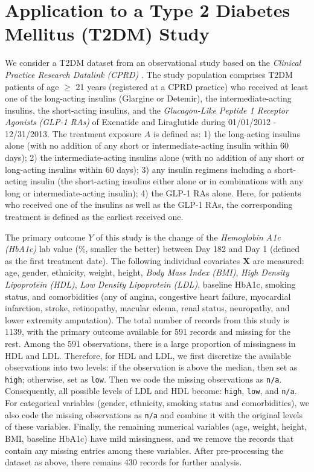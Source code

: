 \documentclass[11pt]{article}
\theoremstyle{definition}
\theoremstyle{remark}
\newcommand{\bX}{\bm{X}}
\begin{document}
\section{Application to a Type 2 Diabetes Mellitus (T2DM) Study}\label{sec:t2dm}

We consider a T2DM dataset from an observational study based on the \textit{Clinical Practice Research Datalink (CPRD)} \citep{herrett2015data,chen2018estimating}. The study population comprises T2DM patients of age $ \ge $ 21 years (registered 
at a CPRD practice) who received at least one of the long-acting insulins (Glargine or Detemir), the intermediate-acting insulins, the short-acting insulins, and the \textit{Glucagon-Like Peptide 1 Receptor Agonists (GLP-1 RAs)} of Exenatide and Liraglutide during 01/01/2012 - 12/31/2013. The treatment exposure $ A $ is defined as: 1) the long-acting insulins alone (with no addition of any short or intermediate-acting insulin within 60 days); 2) the intermediate-acting insulins alone (with no addition of any short or long-acting insulins within 60 days); 3) any insulin regimens including a short-acting insulin (the short-acting insulins either alone or in combinations with any long or intermediate-acting insulin); 4) the GLP-1 RAs alone. Here, for patients who received one of the insulins as well as the GLP-1 RAs, the corresponding treatment is defined as the earliest received one. 

The primary outcome $ Y $ of this study is the change of the \textit{Hemoglobin A1c (HbA1c)} lab value (\%, smaller the better) between Day 182 and Day 1 (defined as the first treatment date). The following individual covariates $ \bX $ are measured: age, gender, ethnicity, weight, height, \textit{Body Mass Index (BMI)}, \textit{High Density Lipoprotein (HDL)}, \textit{Low Density Lipoprotein (LDL)}, baseline HbA1c, smoking status, and comorbidities (any of angina, congestive heart failure, myocardial infarction, stroke, retinopathy, macular edema, renal status, neuropathy, and lower extremity amputation). The total number of records from this study is 1139, with the primary outcome available for 591 records and missing for the rest. Among the 591 observations, there is a large proportion of missingness in HDL and LDL. Therefore, for HDL and LDL, we first discretize the available observations into two levels: if the observation is above the median, then set as \texttt{high}; otherwise, set as \texttt{low}. Then we code the missing observations as \texttt{n/a}. Consequently,  all possible levels of LDL and HDL become: \texttt{high}, \texttt{low}, and \texttt{n/a}. For  categorical variables (gender, ethnicity, smoking status and comorbidities), we also code the missing observations as \texttt{n/a} and combine it with the original levels of these variables. Finally, the remaining numerical variables (age, weight, height, BMI, baseline HbA1c) have mild missingness, and we remove the records that contain any missing entries among these variables. After pre-processing the dataset as above, there remains 430 records for further analysis.
\end{document}
